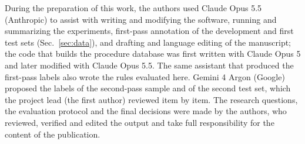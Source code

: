 During the preparation of this work, the authors used Claude Opus 5.5 (Anthropic) to assist with writing and modifying the software,
running and summarizing the experiments, first-pass annotation of the development and first test sets (Sec.~\ref{sec:data}), and drafting and language
editing of the manuscript; the code that builds the procedure database was first written with Claude Opus 5 and later modified with
Claude Opus 5.5. The same assistant that produced the first-pass labels also wrote the rules evaluated here. Gemini 4 Argon (Google)
proposed the labels of the second-pass sample and of the second test set, which the project lead (the first author) reviewed item by item. The research questions,
the evaluation protocol and the final decisions were made by the authors, who reviewed, verified and edited the output and take full
responsibility for the content of the publication.
